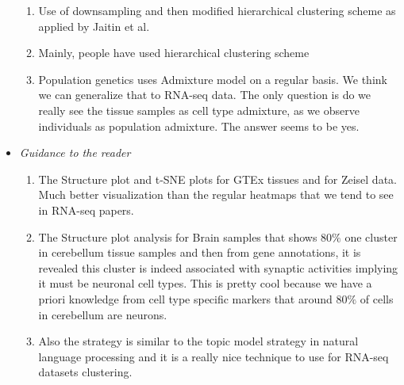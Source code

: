 \begin{itemize}
\begin{enumerate}
\item Use of downsampling and then modified hierarchical clustering scheme as applied by Jaitin et al.

\item Mainly, people have used hierarchical clustering scheme

\item Population genetics uses Admixture model on a regular basis. We think we can generalize that to RNA-seq data. The only question is do we really see the tissue samples as cell type admixture, as we observe individuals as population admixture. The answer seems to be yes.

\end{enumerate}

\item \textit{Guidance to the reader}
\begin{enumerate}
\item The Structure plot and t-SNE plots  for GTEx tissues and for Zeisel data. Much better visualization than the regular heatmaps that we tend to see in RNA-seq papers. 

\item The Structure plot analysis for Brain samples that shows $80\%$ one cluster in cerebellum tissue samples and then from gene annotations, it is revealed this  cluster is indeed associated with synaptic activities implying it must be neuronal cell types. This is pretty cool because we have a priori knowledge from cell type specific markers that around $80\%$ of cells in cerebellum are neurons.

\item Also the strategy is similar to the topic model strategy in natural language processing and it is a really nice technique to use for RNA-seq datasets clustering.

\end{enumerate}

\end{itemize}

